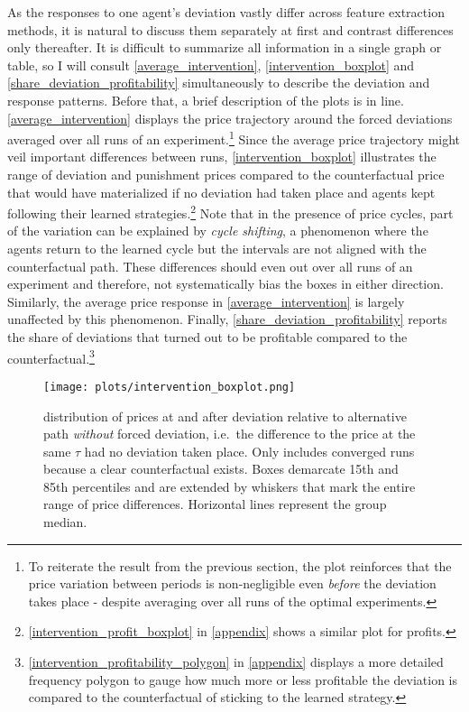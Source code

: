 As the responses to one agent's deviation vastly differ across feature extraction methods, it is natural to discuss them separately at first and contrast differences only thereafter.  It is difficult to summarize all information in a single graph or table, so I will consult \autoref{average_intervention}, \autoref{intervention_boxplot} and \autoref{share_deviation_profitability} simultaneously to describe the deviation and response patterns. Before that, a brief description of the plots is in line. \autoref{average_intervention} displays the price trajectory around the forced deviations averaged over all runs of an experiment.\footnote{To reiterate the result from the previous section, the plot reinforces that the price variation between periods is non-negligible even \emph{before} the deviation takes place - despite averaging over all runs of the optimal experiments.}  Since the average price trajectory might veil important differences between runs, \autoref{intervention_boxplot} illustrates the range of deviation and punishment prices compared to the counterfactual price that would have materialized if no deviation had taken place and agents kept following their learned strategies.\footnote{\autoref{intervention_profit_boxplot} in \autoref{appendix} shows a similar plot for profits.} Note that in the presence of price cycles, part of the variation can be explained by \emph{cycle shifting}, a phenomenon where the agents return to the learned cycle but the intervals are not aligned with the counterfactual path. These differences should even out over all runs of an experiment and therefore, not systematically bias the boxes in either direction. Similarly, the average price response in \autoref{average_intervention} is largely unaffected by this phenomenon. Finally, \autoref{share_deviation_profitability} reports the share of deviations that turned out to be profitable compared to the counterfactual.\footnote{\autoref{intervention_profitability_polygon} in \autoref{appendix} displays a more detailed frequency polygon to gauge how much more or less profitable the deviation is compared to the counterfactual of sticking to the learned strategy.}

\begin{figure}
	\texttt{[image: plots/intervention\_boxplot.png]}
	\caption{distribution of prices at and after deviation relative to alternative path \emph{without} forced deviation, i.e.\ the difference to the price at the same $\tau$ had no deviation taken place. Only includes converged runs because a clear counterfactual exists. Boxes demarcate 15th and 85th percentiles and are extended by whiskers that mark the entire range of price differences. Horizontal lines represent the group median.}
	\label{intervention_boxplot}
\end{figure}

